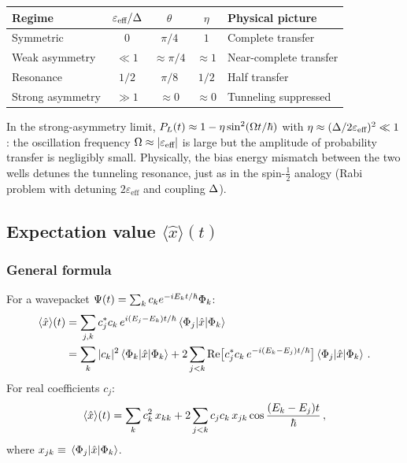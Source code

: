 \begin{center}
\renewcommand{\arraystretch}{1.4}
\begin{tabular}{lcccl}
  \toprule
  Regime & $\varepsilon_{\text{eff}}/\Delta$ & $\theta$ & $\eta$ & Physical picture \\
  \midrule
  Symmetric & $0$ & $\pi/4$ & $1$ & Complete transfer \\
  Weak asymmetry & $\ll 1$ & $\approx\pi/4$ & $\approx 1$ & Near-complete transfer \\
  Resonance & $1/2$ & $\pi/8$ & $1/2$ & Half transfer \\
  Strong asymmetry & $\gg 1$ & $\approx 0$ & $\approx 0$ & Tunneling suppressed \\
  \bottomrule
\end{tabular}
\end{center}

In the strong-asymmetry limit, $P_L(t) \approx 1 - \eta\sin^2(\Omega t/\hbar)$ with
$\eta \approx (\Delta/2\varepsilon_{\text{eff}})^2 \ll 1$: the oscillation frequency
$\Omega \approx |\varepsilon_{\text{eff}}|$ is large but the amplitude of probability
transfer is negligibly small. Physically, the bias energy mismatch between the two
wells detunes the tunneling resonance, just as in the spin-$\tfrac{1}{2}$ analogy
(Rabi problem with detuning $2\varepsilon_{\text{eff}}$ and coupling $\Delta$).

\subsection{Expectation value $\langle\hat{x}\rangle(t)$}\label{sec:x_expect}

\subsubsection{General formula}

For a wavepacket $\Psi(t) = \sum_k c_k e^{-iE_k t/\hbar}\Phi_k$:
\begin{align}\label{eq:xt_general}
  \langle\hat{x}\rangle(t)
  &= \sum_{j,k}c_j^*c_k\,e^{i(E_j-E_k)t/\hbar}\mel{\Phi_j}{\hat{x}}{\Phi_k}\notag\\
  &= \sum_k |c_k|^2\mel{\Phi_k}{\hat{x}}{\Phi_k}
  + 2\sum_{j<k}\text{Re}\bigl[c_j^*c_k\,e^{-i(E_k-E_j)t/\hbar}\bigr]\mel{\Phi_j}{\hat{x}}{\Phi_k}\,.
\end{align}
For real coefficients $c_j$:
\begin{equation}\label{eq:xt_real}
  \langle\hat{x}\rangle(t) = \sum_k c_k^2\,x_{kk}
  + 2\sum_{j<k}c_j c_k\,x_{jk}\cos\frac{(E_k-E_j)t}{\hbar}\,,
\end{equation}
where $x_{jk} \equiv \mel{\Phi_j}{\hat{x}}{\Phi_k}$.

